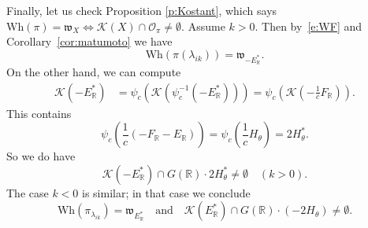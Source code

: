 \documentclass[cupthm]{CUP-JNL-JMJ}
\numberwithin{equation}{section}
\theoremstyle{cupplain}
\theoremstyle{cupdefinition}
\theoremstyle{cupremark}
\theoremstyle{cupproof}
\renewcommand{\O}{\mathcal O}
\newcommand{\R}{\mathbb R}
\newcommand{\K}{\mathcal K}
\newcommand\inv{^{-1}}
\newcommand{\w}{\mathfrak w}
\newcommand{\Wh}{\mathrm{Wh}}
\begin{document}
Finally, let us check Proposition \ref{p:Kostant}, 
which says $\Wh(\pi)=\w_X\Leftrightarrow \K(X)\cap\O_\pi\ne \emptyset$. 
Assume $k>0$. Then by~\eqref{e:WF} and Corollary~\ref{cor:matumoto} we have
$$
\Wh(\pi(\lambda_{ik}))=\mathfrak{w}_{-E_\R^*}.
$$
On the other hand, we can compute
$$
\begin{aligned}
\K(-E_\R^*)&=\psi_c(\K(\psi_c\inv(-E_\R^*))) =\psi_c(\K( -\frac 1cF_\R)).\end{aligned}$$
This contains
$$ \psi_c\left(\frac 1c(-F_\R-E_\R)\right)=\psi_c(\frac 1cH_\theta)=2H_\theta^*.
$$
So we do have
$$
\K(-E_\R^*)\cap G(\R)\cdot 2H_{\theta}^*\ne\emptyset\quad (k>0).
$$
The case $k<0$ is similar; in that case we conclude
\[ \Wh(\pi_{\lambda_{ik}})=\mathfrak{w}_{E_\R^\ast} \quad \text{and}\quad \K(E_\R^*)\cap G(\R)\cdot (-2H_\theta)\ne \emptyset.\]







\end{document}
